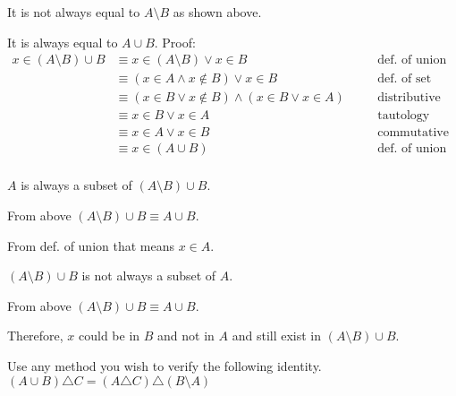 It is not always equal to $A \setminus B$ as shown above.

It is always equal to $A \cup B$. Proof:
\begin{align*}
x \in (A \setminus B) \cup B &\equiv x \in (A \setminus B) \vee x \in B &&\quad \text{def. of union} \\
&\equiv (x \in A \wedge x \not \in B) \vee x \in B &&\quad \text{def. of set difference} \\
&\equiv (x \in B \vee x \not \in B) \wedge (x \in B \vee x \in A) &&\quad \text{distributive} \\
&\equiv x \in B \vee x \in A &&\quad \text{tautology} \\
&\equiv x \in A  \vee x \in B &&\quad \text{commutative} \\
&\equiv x \in (A \cup B) &&\quad \text{def. of union} \\
\end{align*}

$A$ is always a subset of $(A \setminus B) \cup B$. 

From above $(A \setminus B) \cup B \equiv A \cup B$.

From def. of union that means $x \in A$.

$(A \setminus B) \cup B $ is not always a subset of $A$.

From above $(A \setminus B) \cup B \equiv A \cup B$.

Therefore, $x$ could be in $B$ and not in $A$ and still exist in $(A \setminus B) \cup B$.

\begin{tcolorbox}[title=Problem 16 (a), breakable]
Use any method you wish to verify the following identity.
$(A \cup B) \triangle C = (A \triangle C) \triangle (B \setminus A)$
\end{tcolorbox}

